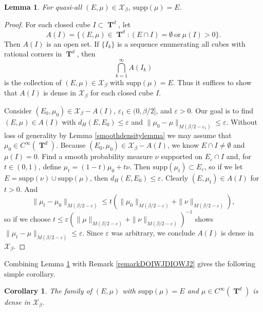 \documentclass[12pt,reqno]{article}
\numberwithin{equation}{section}
\DeclareMathOperator{\TT}{\mathbf{T}}
\newtheorem{lemma}{Lemma}
\newtheorem{corollary}{Corollary}
\begin{document}
\begin{lemma} \label{lemmaOIJAWDIOJW23232}
    For quasi-all $(E,\mu) \in \mathcal{X}_\beta$, $\text{supp}(\mu) = E$.
\end{lemma}
\begin{proof}
    For each closed cube $I \subset \TT^d$, let
    \[ A(I) = \{ (E,\mu) \in \TT^d: (E \cap I) = \emptyset\ \text{or}\ \mu(I) > 0 \}. \]
    Then $A(I)$ is an open set. If $\{ I_k \}$ is a sequence enumerating all cubes with rational corners in $\TT^d$, then
    \[ \bigcap_{k = 1}^\infty A(I_k) \]
    is the collection of $(E,\mu) \in \mathcal{X}_\beta$ with $\text{supp}(\mu) = E$. Thus it suffices to show that $A(I)$ is dense in $\mathcal{X}_\beta$ for each closed cube $I$.

    Consider $(E_0,\mu_0) \in \mathcal{X}_\beta - A(I)$, $\varepsilon_1 \in (0,\beta/2]$, and $\varepsilon > 0$. Our goal is to find $(E,\mu) \in A(I)$ with $d_H(E,E_0) \leq \varepsilon$ and $\| \mu_0 - \mu \|_{M(\beta/2 - \varepsilon_1)} \leq \varepsilon$. Without loss of generality by Lemma \ref{smoothdensitylemma} we may assume that $\mu_0 \in C^\infty(\TT^d)$. Because $(E_0,\mu_0) \in \mathcal{X}_\beta - A(I)$, we know $E \cap I \neq \emptyset$ and $\mu(I) = 0$. Find a smooth probability measure $\nu$ supported on $E_\varepsilon \cap I$ and, for $t \in (0,1)$, define $\mu_t = (1 - t) \mu_0 + t \nu$. Then $\text{supp}(\mu_t) \subset E_\varepsilon$, so if we let $E = \text{supp}(\nu) \cup \text{supp}(\mu)$, then $d_H(E,E_0) \leq \varepsilon$. Clearly $(E,\mu_t) \in A(I)$ for $t > 0$. And
    \[ \| \mu_t - \mu_0 \|_{M(\beta/2 - \varepsilon)} \leq t \left( \| \mu_0 \|_{M(\beta/2 - \varepsilon)} + \| \nu \|_{M(\beta/2 - \varepsilon)} \right), \]
    so if we choose $t \leq \varepsilon (\| \mu \|_{M(\beta/2 - \varepsilon)} + \| \nu \|_{M(\beta/2 - \varepsilon)})^{-1}$ shows $\| \mu_t - \mu \|_{M(\beta/2 - \varepsilon)} \leq \varepsilon$. Since $\varepsilon$ was arbitrary, we conclude $A(I)$ is dense in $\mathcal{X}_\beta$.
\end{proof}

Combining Lemma \ref{lemmaOIJAWDIOJW23232} with Remark \ref{remarkDOIWJDIOWJ2} gives the following simple corollary.

\begin{corollary} \label{corollaryOIDJOWIJD2212}
    The family of $(E,\mu)$ with $\text{supp}(\mu) = E$ and $\mu \in C^\infty(\TT^d)$ is dense in $\mathcal{X}_\beta$.
\end{corollary}
\end{document}
